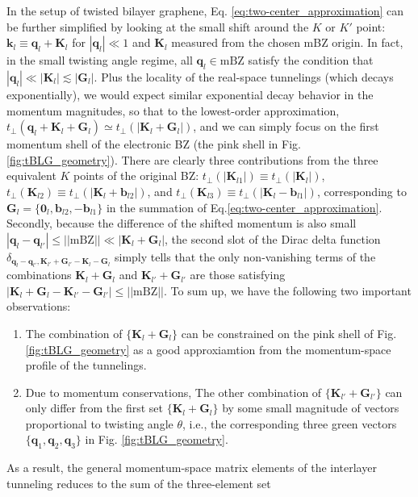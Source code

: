 In the setup of twisted bilayer graphene, Eq. \eqref{eq:two-center_approximation} can be further simplified by looking at the small shift around the $K$ or $K'$ point: $\bm k_l\equiv\bm q_l+\bm K_l$ for $|\bm q_l|\ll1$ and $\bm K_l$ measured from the chosen mBZ origin. In fact, in the small twisting angle regime, all $\bm q_l\in\text{mBZ}$ satisfy the condition that $|\bm q_l|\ll|\bm K_l|\lesssim|\bm G_l|$. Plus the locality of the real-space tunnelings (which decays exponentially), we would expect similar exponential decay behavior in the momentum magnitudes, so that to the lowest-order approximation, $t_\perp(\bm q_l+\bm K_l+\bm G_l)\simeq t_\perp(|\bm K_l+\bm G_l|)$, and we can simply focus on the first momentum shell of the electronic BZ (the pink shell in Fig. \ref{fig:tBLG_geometry}). There are clearly three contributions from the three equivalent $K$ points of the original BZ: $t_\perp(|\bm K_{l1}|)\equiv t_\perp(|\bm K_l|)$, $t_\perp(\bm K_{l2})\equiv t_\perp(|\bm K_l+\bm b_{l2}|)$, and $t_\perp(\bm K_{l3})\equiv t_\perp(|\bm K_l-\bm b_{l1}|)$, corresponding to $\bm G_l=\{\bm 0_l,\bm b_{l2},-\bm b_{l1}\}$ in the summation of Eq.\eqref{eq:two-center_approximation}. Secondly, because the difference of the shifted momentum is also small $|\bm q_l-\bm q_{l'}|\leq ||\text{mBZ}||\ll |\bm K_l+\bm G_l|$, the second slot of the Dirac delta function $\delta_{\bm q_l-\bm q_{l'},\bm K_{l'}+\bm G_{l'}-\bm K_l-\bm G_l}$ simply tells that the only non-vanishing terms of the combinations $\bm K_l+\bm G_l$ and $\bm K_{l'}+\bm G_{l'}$ are those satisfying $|\bm K_l+\bm G_l-\bm K_{l'}-\bm G_{l'}|\leq||\text{mBZ}||$. To sum up, we have the following two important observations:
\begin{enumerate}
    \item The combination of $\{\bm K_l+\bm G_l\}$ can be constrained on the pink shell of Fig. \ref{fig:tBLG_geometry} as a good approxiamtion from the momentum-space profile of the tunnelings.
    \item Due to momentum conservations, The other combination of $\{\bm K_{l'}+\bm G_{l'}\}$ can only differ from the first set $\{\bm K_l+\bm G_l\}$ by some small magnitude of vectors proportional to twisting angle $\theta$, i.e., the corresponding three green vectors $\{\bm q_1,\bm q_2,\bm q_3\}$ in Fig. \ref{fig:tBLG_geometry}.
\end{enumerate}
As a result, the general momentum-space matrix elements of the interlayer tunneling reduces to the sum of the three-element set
